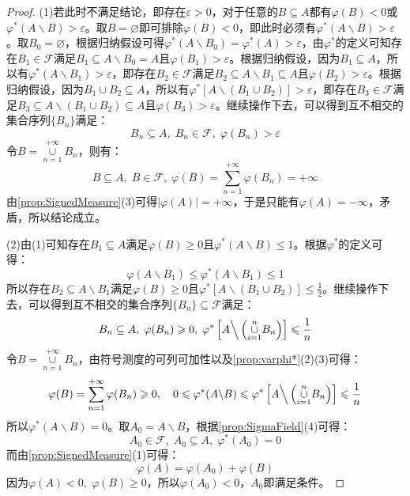\begin{proof}
	(1)若此时不满足结论，即存在$\varepsilon>0$，对于任意的$B\subseteq A$都有$\varphi(B)<0$或$\varphi^*(A\backslash B)>\varepsilon$。取$B=\varnothing$即可排除$\varphi(B)<0$，即此时必须有$\varphi^*(A\backslash B)>\varepsilon$。取$B_0=\varnothing$，根据归纳假设可得$\varphi^*(A\backslash B_0)=\varphi^*(A)>\varepsilon$，由$\varphi^*$的定义可知存在$B_1\in\mathscr{F}$满足$B_1\subseteq A\backslash B_0=A$且$\varphi(B_1)>\varepsilon$。根据归纳假设，因为$B_1\subseteq A$，所以有$\varphi^*(A\backslash B_1)>\varepsilon$，即存在$B_2\in\mathscr{F}$满足$B_2\subseteq A\backslash B_1\subseteq A$且$\varphi(B_2)>\varepsilon$。根据归纳假设，因为$B_1\cup B_2\subseteq A$，所以有$\varphi^*[A\backslash(B_1\cup B_2)]>\varepsilon$，即存在$B_3\in\mathscr{F}$满足$B_3\subseteq A\backslash(B_1\cup B_2)\subseteq A$且$\varphi(B_3)>\varepsilon$。继续操作下去，可以得到互不相交的集合序列$\{B_n\}$满足：
	\begin{equation*}
		B_n\subseteq A,\;B_n\in\mathscr{F},\;\varphi(B_n)>\varepsilon
	\end{equation*}
	令$B=\underset{n=1}{\overset{+\infty}{\cup}}B_n$，则有：
	\begin{equation*}
		B\subseteq A,\;B\in\mathscr{F},\;\varphi(B)=\sum_{n=1}^{+\infty}\varphi(B_n)=+\infty
	\end{equation*}
	由\cref{prop:SignedMeasure}(3)可得$|\varphi(A)|=+\infty$，于是只能有$\varphi(A)=-\infty$，矛盾，所以结论成立。\par
	(2)由(1)可知存在$B_1\subseteq A$满足$\varphi(B)\geqslant0$且$\varphi^*(A\backslash B)\leqslant1$。根据$\varphi^*$的定义可得：
	\begin{equation*}
		\varphi(A\backslash B_1)\leqslant\varphi^*(A\backslash B_1)\leqslant1
	\end{equation*}
	所以存在$B_2\subseteq A\backslash B_1$满足$\varphi(B)\geqslant0$且$\varphi^*[A\backslash (B_1\cup B_2)]\leqslant\frac{1}{2}$。继续操作下去，可以得到互不相交的集合序列$\{B_n\}\subseteq\mathscr{F}$满足：
	\begin{equation*}
		B_n\subseteq A,\;\varphi(B_n)\geqslant0,\;\varphi^*\left[A\Big\backslash\left(\underset{i=1}{\overset{n}{\cup}}B_n\right)\right]\leqslant\frac{1}{n}
	\end{equation*}
	令$B=\underset{n=1}{\overset{+\infty}{\cup}}B_n$，由符号测度的可列可加性以及\cref{prop:varphi*}(2)(3)可得：
	\begin{equation*}
		\varphi(B)=\sum_{n=1}^{+\infty}\varphi(B_n)\geqslant0,\quad0\leqslant\varphi^*(A\backslash B)\leqslant\varphi^*\left[A\Big\backslash\left(\underset{i=1}{\overset{n}{\cup}}B_n\right)\right]\leqslant\frac{1}{n}
	\end{equation*}
	所以$\varphi^*(A\backslash B)=0$。取$A_0=A\backslash B$，根据\cref{prop:SigmaField}(4)可得：
	\begin{equation*}
		A_0\in\mathscr{F},\;A_0\subseteq A,\;\varphi^*(A_0)=0
	\end{equation*}
	而由\cref{prop:SignedMeasure}(1)可得：
	\begin{equation*}
		\varphi(A)=\varphi(A_0)+\varphi(B)
	\end{equation*}
	因为$\varphi(A)<0,\;\varphi(B)\geqslant0$，所以$\varphi(A_0)<0$，$A_0$即满足条件。
\end{proof}
